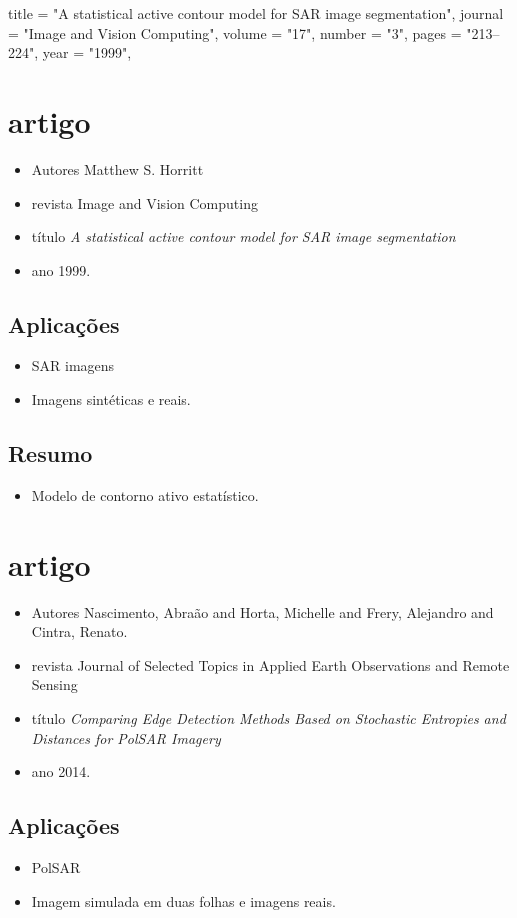 \documentclass{article}
\begin{document}
title = "A statistical active contour model for {SAR} image segmentation",
journal = "Image and Vision Computing",
volume = "17",
number = "3",
pages = "213--224",
year = "1999",

\section{artigo \cite{horrit}}
\begin{itemize}
\item Autores Matthew S. Horritt
\item revista Image and Vision Computing
\item título \textit{A statistical active contour model for {SAR} image segmentation}
\item ano 1999.
\end{itemize}
\subsection{Aplicações}
\begin{itemize}
\item SAR imagens
\item Imagens sintéticas e reais.
\end{itemize}
\subsection{Resumo}
\begin{itemize}
\item Modelo de contorno ativo estatístico.
\end{itemize}

\section{artigo \cite{nhfc}}
\begin{itemize}
\item Autores Nascimento, Abraão and Horta, Michelle and Frery, Alejandro and Cintra, Renato.
\item revista Journal of Selected Topics in Applied Earth Observations and Remote Sensing
\item título \textit{Comparing Edge Detection Methods Based on Stochastic Entropies and Distances for {P}ol{SAR} Imagery}
\item ano 2014.
\end{itemize}
\subsection{Aplicações}
\begin{itemize}
\item PolSAR
\item Imagem simulada em duas folhas e imagens reais.
\end{itemize}
\end{document}
